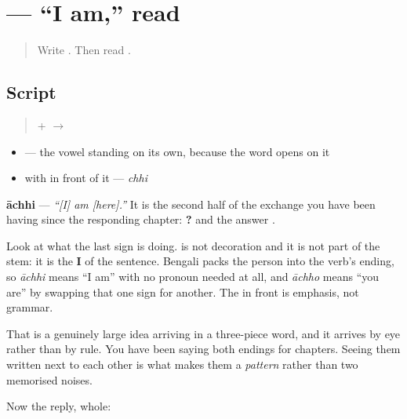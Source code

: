 \section[\texorpdfstring{\bn{আছি} (āchhi)}{আছি (āchhi)}]{ — \textquotedblleft{}I am,\textquotedblright{} read}

\label{lesson:BN-W04-achhi-read}



\begin{quote}
Write \textbf{}. Then read \textbf{}.
\end{quote}

\subsection*{Script}
\begin{quote}
\textbf{} + \textbf{} $\to$ \textbf{}
\end{quote}

\begin{itemize}
\raggedright
  \item \textbf{} — the vowel standing on its own, because the word opens on it
  \item \textbf{} with \textbf{} in front of it — \emph{chhi}
\end{itemize}

\textbf{āchhi} — \emph{\textquotedblleft{}{[}I{]} am {[}here{]}.\textquotedblright{}} It is the second half of the exchange you have been having since the responding chapter: \textbf{  ?} and the answer \textbf{  }.

Look at what the last sign is doing. \textbf{} is not decoration and it is not part of the stem: it is the \textbf{I} of the sentence. Bengali packs the person into the verb's ending, so \emph{āchhi} means \textquotedblleft{}I am\textquotedblright{} with no pronoun needed at all, and \emph{āchho} means \textquotedblleft{}you are\textquotedblright{} by swapping that one sign for another. The \textbf{} in front is emphasis, not grammar.

That is a genuinely large idea arriving in a three-piece word, and it arrives by eye rather than by rule. You have been saying both endings for chapters. Seeing them written next to each other is what makes them a \emph{pattern} rather than two memorised noises.

Now the reply, whole:

\begin{quote}
\textbf{  }
\end{quote}

